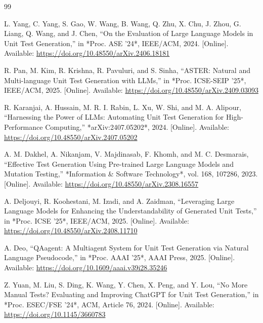 \documentclass[conference]{IEEEtran}
\begin{document}
\begin{thebibliography}{99}

L. Yang, C. Yang, S. Gao, W. Wang, B. Wang, Q. Zhu, X. Chu, J. Zhou, G. Liang, Q. Wang, and J. Chen, 
``On the Evaluation of Large Language Models in Unit Test Generation,'' in *Proc. ASE ’24*, IEEE/ACM, 2024. 
[Online]. Available: \href{https://doi.org/10.48550/arXiv.2406.18181}{https://doi.org/10.48550/arXiv.2406.18181}

R. Pan, M. Kim, R. Krishna, R. Pavuluri, and S. Sinha, 
``ASTER: Natural and Multi-language Unit Test Generation with LLMs,'' in *Proc. ICSE-SEIP ’25*, IEEE/ACM, 2025. 
[Online]. Available: \href{https://doi.org/10.48550/arXiv.2409.03093}{https://doi.org/10.48550/arXiv.2409.03093}

R. Karanjai, A. Hussain, M. R. I. Rabin, L. Xu, W. Shi, and M. A. Alipour, 
``Harnessing the Power of LLMs: Automating Unit Test Generation for High-Performance Computing,'' *arXiv:2407.05202*, 2024. 
[Online]. Available: \href{https://doi.org/10.48550/arXiv.2407.05202}{https://doi.org/10.48550/arXiv.2407.05202}

A. M. Dakhel, A. Nikanjam, V. Majdinasab, F. Khomh, and M. C. Desmarais, 
``Effective Test Generation Using Pre-trained Large Language Models and Mutation Testing,'' *Information \& Software Technology*, vol. 168, 107286, 2023. 
[Online]. Available: \href{https://doi.org/10.48550/arXiv.2308.16557}{https://doi.org/10.48550/arXiv.2308.16557}

A. Deljouyi, R. Koohestani, M. Izadi, and A. Zaidman, 
``Leveraging Large Language Models for Enhancing the Understandability of Generated Unit Tests,'' in *Proc. ICSE ’25*, IEEE/ACM, 2025. 
[Online]. Available: \href{https://doi.org/10.48550/arXiv.2408.11710}{https://doi.org/10.48550/arXiv.2408.11710}

A. Deo, 
``QAagent: A Multiagent System for Unit Test Generation via Natural Language Pseudocode,'' in *Proc. AAAI ’25*, AAAI Press, 2025. 
[Online]. Available: \href{https://doi.org/10.1609/aaai.v39i28.35246}{https://doi.org/10.1609/aaai.v39i28.35246}

Z. Yuan, M. Liu, S. Ding, K. Wang, Y. Chen, X. Peng, and Y. Lou, 
``No More Manual Tests? Evaluating and Improving ChatGPT for Unit Test Generation,'' in *Proc. ESEC/FSE ’24*, ACM, Article 76, 2024. 
[Online]. Available: \href{https://doi.org/10.1145/3660783}{https://doi.org/10.1145/3660783}


\end{thebibliography}
\end{document}
